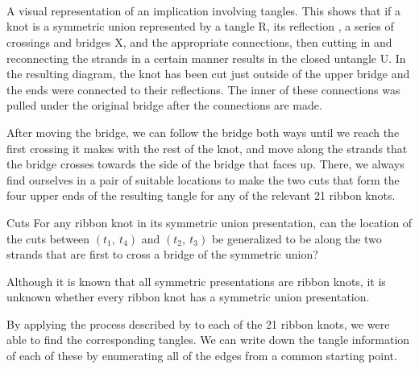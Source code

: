 \begin{paper}
{\hspace{0.3in}\hspace{15.1ex}\\

\\

\vspace{-6em}\hspace{0.3in}\hspace{14.8ex}\\

\vspace{-6.7em}\hfill{}}
{A visual representation of an implication involving tangles.
This shows that if a knot is a symmetric union represented by a tangle R, its
reflection \usebox{\knotR}, a series of crossings and bridges X, and the
appropriate connections, then cutting in and reconnecting the strands in a
certain manner results in the closed untangle U.
In the resulting diagram, the knot has been cut just outside of the upper bridge
and the ends were connected to their reflections.
The inner of these connections was pulled under the original bridge after the
connections are made.}

After moving the bridge, we can follow the bridge both ways until we reach the
first crossing it makes with the rest of the knot, and move along the strands
that the bridge crosses towards the side of the bridge that faces up.
There, we always find ourselves in a pair of suitable locations to make the two
cuts that form the four upper ends of the resulting tangle for any of the
relevant 21 ribbon knots.

\begin{paperqtn}{Cuts}
For any ribbon knot in its symmetric union presentation, can the location of the
cuts between $(t_1,~t_4)$ and $(t_2,~t_3)$ be generalized to be along the
two strands that are first to cross a bridge of the symmetric union?
\end{paperqtn}

Although it is known that all symmetric presentations are ribbon knots, it is
unknown whether every ribbon knot has a symmetric union presentation.


By applying the process described by \thmRibbon to each of the 21 ribbon knots,
we were able to find the corresponding tangles.
We can write down the tangle information of each of these by enumerating all of
the edges from a common starting point.


\end{paper}
